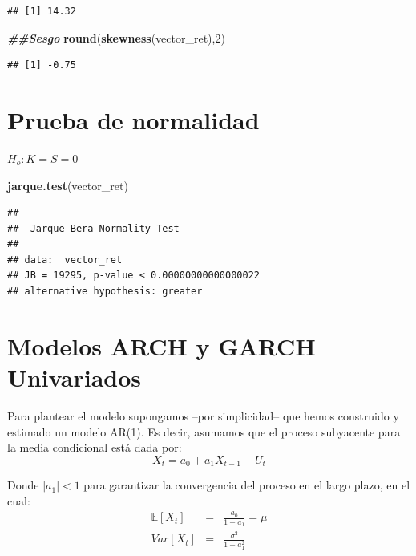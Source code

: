 \documentclass[
]{book}
\newenvironment{Shaded}{\begin{snugshade}}{\end{snugshade}}
\newcommand{\DecValTok}[1]{\textcolor[rgb]{0.00,0.00,0.81}{#1}}
\newcommand{\DocumentationTok}[1]{\textcolor[rgb]{0.56,0.35,0.01}{\textbf{\textit{#1}}}}
\newcommand{\FunctionTok}[1]{\textcolor[rgb]{0.13,0.29,0.53}{\textbf{#1}}}
\newcommand{\NormalTok}[1]{#1}
\begin{document}
\begin{verbatim}
## [1] 14.32
\end{verbatim}

\begin{Shaded}
\begin{Highlighting}[]
\DocumentationTok{\#\#Sesgo}
\FunctionTok{round}\NormalTok{(}\FunctionTok{skewness}\NormalTok{(vector\_ret),}\DecValTok{2}\NormalTok{)}
\end{Highlighting}
\end{Shaded}

\begin{verbatim}
## [1] -0.75
\end{verbatim}

\hypertarget{prueba-de-normalidad}{%
\section{Prueba de normalidad}\label{prueba-de-normalidad}}

\(H_o: K=S=0\)

\begin{Shaded}
\begin{Highlighting}[]
\FunctionTok{jarque.test}\NormalTok{(vector\_ret)}
\end{Highlighting}
\end{Shaded}

\begin{verbatim}
## 
##  Jarque-Bera Normality Test
## 
## data:  vector_ret
## JB = 19295, p-value < 0.00000000000000022
## alternative hypothesis: greater
\end{verbatim}

\hypertarget{modelos-arch-y-garch-univariados}{%
\section{Modelos ARCH y GARCH Univariados}\label{modelos-arch-y-garch-univariados}}

Para plantear el modelo supongamos --por simplicidad-- que hemos construido y estimado un modelo AR(1). Es decir, asumamos que el proceso subyacente para la media condicional está dada por:
\begin{equation}
    X_t = a_0 + a_1 X_{t-1} + U_t
\end{equation}

Donde \(| a_1 |< 1\) para garantizar la convergencia del proceso en el largo plazo, en el cual:
\begin{eqnarray*}
    \mathbb{E}[X_t] & = & \frac{a_0 }{1 - a_1} = \mu \\
    Var[X_t] & = & \frac{\sigma^2}{1 - a_1^2}
\end{eqnarray*}
\end{document}
